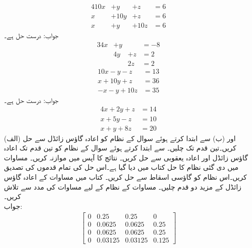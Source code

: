 \quad
\begin{alignat*}{4}
10x&+y&+z&=6\\
x&+10y&+z&=6\\
x&+y&+10z&=6
\end{alignat*}
جواب:\quad
درست حل  ہے۔
\begin{alignat*}{3}
4x&+y&{}&=-8\\
{}&4y&+z&=2\\
&{}&{}2z&=2
\end{alignat*}
\quad
\begin{align*}
10x-y-z&=13\\
x+10y+z&=36\\
-x-y+10z&=35
\end{align*}
جواب:\quad
درست حل  ہے۔
\quad
\begin{align*}
4x+2y+z&=14\\
x+5y-z&=10\\
x+y+8z&=20
\end{align*}
\quad
(الف)  اور (ب)   سے ابتدا کرتے ہوئے سوال  کے نظام کو اعادہ گاؤس زائڈل سے حل کریں۔تین قدم تک چلیں۔ 
\quad
{} سے ابتدا کرتے ہوئے سوال  کے نظام  کو تین قدم تک اعادہ گاؤس زائڈل اور اعادہ یعقوبی سے حل کریں۔ نتائج کا آپس میں موازنہ کریں۔
\quad
مساوات  میں دی گئی نظام کا حل کتاب میں دیا گیا ہے۔اس حل کی تمام قدموں  کی تصدیق کریں۔اس نظام کو گاؤسی اسقاط سے حل کریں۔
\quad
کتاب میں مساوات  کے اعادہ  گاؤس زائڈل   کے مزید دو قدم چلیں۔ 
\quad
مساوات   کے نظام کے لیے مساوات   کی مدد سے  تلاش کریں۔\\
جواب:
\begin{align*}
\begin{bmatrix}
0&0.25&0.25&0\\
0&0.0625&0.0625&0.25\\
0&0.0625&0.0625&0.25\\
0&0.03125&0.03125&0.125
\end{bmatrix}
\end{align*}
